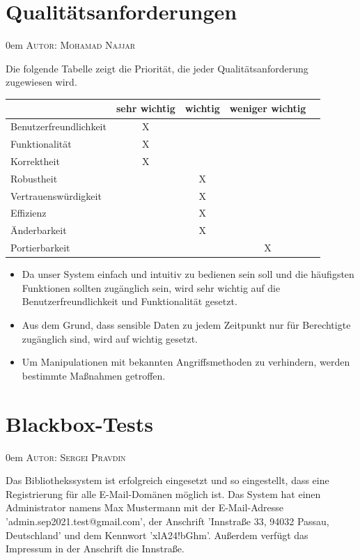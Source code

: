\documentclass{article}
\makeatletter
\newcommand{\sectionauthor}[1]{
	{\parindent 0em \large \scshape Autor: #1 \par \nobreak \vspace*{2em}}
	\@afterheading
}
\makeatother
\begin{document}
\restoregeometry
\newpage

\section{Qualitätsanforderungen} %
\sectionauthor{Mohamad Najjar}

Die folgende Tabelle zeigt die Priorität, die jeder Qualitätsanforderung zugewiesen wird.
	
\begin{center}
\begin{tabular}{ |l||c|c|c|c| } 
 \hline
  & sehr wichtig & wichtig & weniger wichtig &\\
 \hline\hline
 Benutzerfreundlichkeit & X & & & \\
 \hline
 Funktionalität & X & & & \\ 
 \hline
 Korrektheit & X & & & \\
 \hline
 Robustheit & & X & & \\
 \hline
 Vertrauenswürdigkeit & & X & & \\
 \hline
 Effizienz & & X & & \\
 \hline
 Änderbarkeit & & X & & \\
 \hline
 Portierbarkeit & &   & X & \\

 \hline
\end{tabular}
\end{center}
\begin{itemize}
\item Da  unser System einfach und intuitiv zu bedienen sein soll und die häufigsten Funktionen sollten
 zugänglich sein, wird sehr wichtig  auf die Benutzerfreundlichkeit und Funktionalität gesetzt.
\item Aus dem Grund, dass sensible Daten zu jedem Zeitpunkt nur für Berechtigte zugänglich sind, wird auf  wichtig gesetzt.
\item Um Manipulationen mit bekannten Angriffsmethoden zu verhindern, werden bestimmte Maßnahmen getroffen.
\end{itemize}

\section{Blackbox-Tests} %
\sectionauthor{Sergei Pravdin}
Das Bibliothekssystem ist erfolgreich eingesetzt und so eingestellt, dass eine Registrierung für alle E-Mail-Domänen möglich ist. Das System hat einen Administrator namens Max Mustermann mit der E-Mail-Adresse 'admin.sep2021.test@gmail.com', der Anschrift 'Innstraße 33, 94032 Passau, Deutschland' und dem Kennwort 'xlA24!bGhm'. Außerdem verfügt das Impressum in der Anschrift die Innstraße. \vspace{0.5em}
\end{document}
